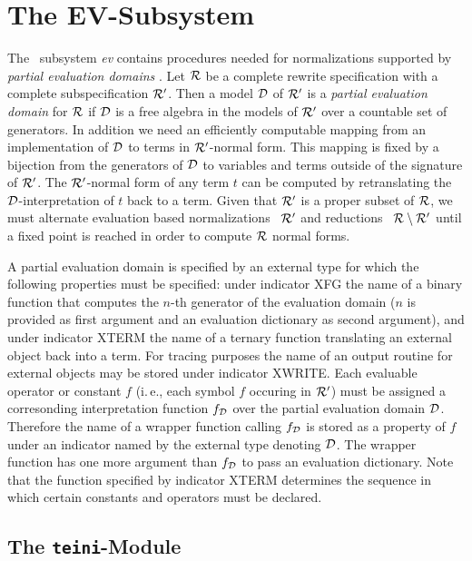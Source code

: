 \section{The EV-Subsystem} \label{se:ev}

The \redux\ subsystem {\it ev} contains procedures needed for
normalizations supported by {\em partial evaluation domains}
\cite{BuendgenLauterbach:96}.
Let $\cal R$ be a complete rewrite specification with a complete 
subspecification $\cal R'$.
Then  a model $\cal D$ of $\cal R'$  is a {\em partial evaluation domain}
for $\cal R$ 
if $\cal D$ is a free algebra in the models of $\cal R'$ over a countable 
set of generators.
In addition we need an efficiently computable mapping from an implementation
of  $\cal D$ to
terms in $\cal R'$-normal form.
This mapping is fixed by a bijection from the generators of $\cal D$ to 
variables and terms outside of the signature of $\cal R'$.
The $\cal R'$-normal form of any term $t$ can be computed by retranslating
the $\cal D$-interpretation of $t$ back to a term.
Given that ${\cal R}'$ is a proper subset of $\cal R$, 
we must alternate evaluation based normalizations \wrt\ ${\cal R}'$ and
reductions \wrt\ ${\cal R}\setminus {\cal R}'$ until a fixed point is
reached in order to compute $\cal R$ normal forms.

A partial evaluation domain is specified by an external type
for which the following properties must be specified:
under indicator XFG the name of a binary function that computes
the $n$-th generator of the evaluation domain 
($n$ is provided as first argument and an evaluation dictionary as second
argument),
and under indicator XTERM the name of a ternary function translating an 
external object back into a term.
For tracing purposes the name of an output routine for external objects may
be stored under indicator XWRITE.
Each evaluable operator or constant $f$ 
(i.\,e., each symbol $f$ occuring in $\cal R'$)
must be assigned a corresonding interpretation 
function $f_{\cal D}$ over the partial evaluation domain $\cal D$.
Therefore the name of a wrapper function calling $f_{\cal D}$ is stored as
a property of $f$ under an indicator named by the external type denoting
$\cal D$.
The wrapper function has one more argument than $f_{\cal D}$ to pass
an evaluation dictionary.
Note that the function specified by indicator XTERM determines
the sequence in which certain constants and operators must be declared.

\subsection{The {\tt teini}-Module}

